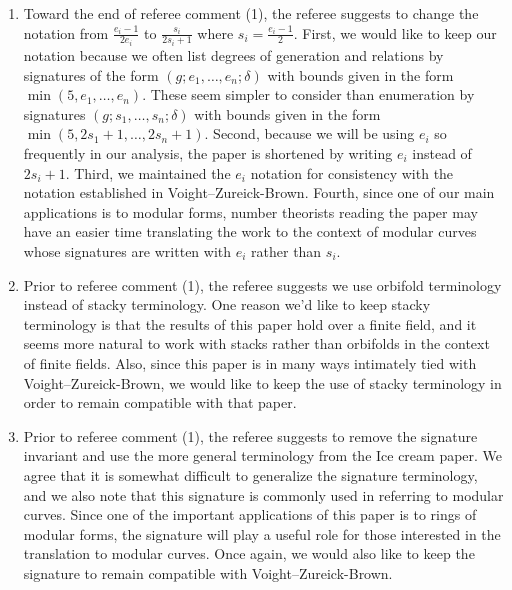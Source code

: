 \documentclass[10 pt]{amsart}
\theoremstyle{plain}
\theoremstyle{definition}
\theoremstyle{remark}
\numberwithin{equation}{section}
\begin{document}
\begin{enumerate}
	\item Toward the end of referee comment (1), the referee suggests
		to change the notation from $\frac{e_i - 1}{2 e_i}$
		to $\frac{s_i}{2 s_i + 1}$ where $s_i = \frac{e_i - 1}{2}$.
		First, we would like to keep our notation because we often
	list degrees of generation and relations by signatures
	of the form $(g; e_1, \ldots, e_n; \delta)$ with bounds given in
	the form $\min(5, e_1, \ldots, e_n)$. These
	seem simpler to
	consider than enumeration by signatures $(g; s_1, \ldots, s_n;
	\delta)$ with bounds given in the form $\min(5, 2s_1 + 1, \ldots,
	2s_n + 1)$. Second, because we will be using $e_i$
	so frequently in our analysis, the paper is shortened
	by writing $e_i$ instead of $2s_i+1$.
	Third, we maintained the $e_i$ notation for consistency
	with the notation established in Voight--Zureick-Brown.
	Fourth, since one of our main applications is to modular forms,
	number theorists reading the paper may have an easier time
	translating the work to the context of modular curves whose 
	signatures are written with $e_i$ rather than $s_i$.
	\item Prior to referee comment (1), the referee suggests we use 
orbifold terminology instead
		of stacky terminology. 
		One reason we'd like to keep stacky terminology is
		that the results of this paper hold over a finite field,
		and it seems more natural to 
work with	stacks rather than orbifolds in the context of finite fields.
		Also, since this paper is in many
		ways intimately tied with Voight--Zureick-Brown,
		we would like to keep the use of stacky terminology
		in order to remain compatible with that paper.
	\item Prior to referee comment (1), the referee suggests to 
remove the signature invariant
		and use the more general terminology from the
		Ice cream paper. We agree that it is
		somewhat difficult to generalize the
		signature terminology,
		and we also note that this signature is commonly used in 
referring
		to modular curves. Since one of the important
		applications of this paper is to rings of modular
		forms, the signature will play a useful role for
		those interested in the translation to modular curves.
		Once again, we would also like to keep the signature
		to remain compatible with Voight--Zureick-Brown.
\end{enumerate}
\end{document}
